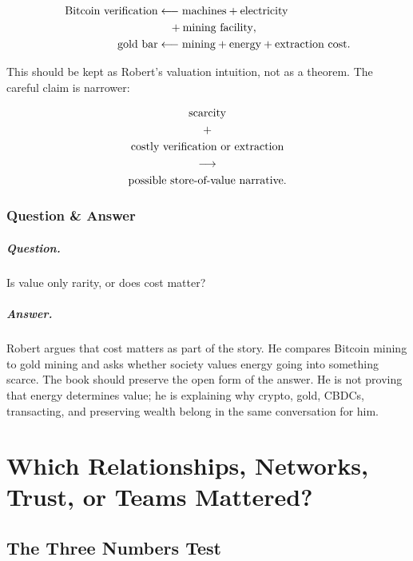 \documentclass[11pt,oneside]{book}
\begin{document}
\begin{align}
\hbox{Bitcoin verification}&\longleftarrow\hbox{machines}+\hbox{electricity}\\
&\quad+\hbox{mining facility},\\
\hbox{gold bar}&\longleftarrow\hbox{mining}+\hbox{energy}+\hbox{extraction cost}.
\end{align}

This should be kept as Robert's valuation intuition, not as a theorem. The careful claim is narrower:

\begin{equation}
\begin{gathered}
\hbox{scarcity}\\
+\\
\hbox{costly verification or extraction}\\
\longrightarrow\\
\hbox{possible store-of-value narrative}.
\end{gathered}
\end{equation}

\subsection{Question \& Answer}

\paragraph{Question.}
Is value only rarity, or does cost matter?

\paragraph{Answer.}
Robert argues that cost matters as part of the story. He compares Bitcoin mining to gold mining and asks whether society values energy going into something scarce. The book should preserve the open form of the answer. He is not proving that energy determines value; he is explaining why crypto, gold, CBDCs, transacting, and preserving wealth belong in the same conversation for him.

\chapter{Which Relationships, Networks, Trust, or Teams Mattered?}

\section{The Three Numbers Test}
\end{document}
